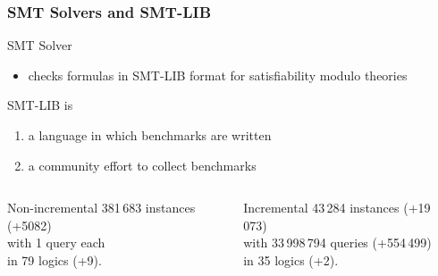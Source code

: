 \documentclass[table]{beamer}
\def\emph#1{\textcolor{MYblue}{#1}}
\begin{document}
\begin{frame}
  \frametitle{SMT Solvers and SMT-LIB}
  SMT Solver
  \begin{itemize}
  \item checks formulas 
    in \emph{SMT-LIB} format
    for \emph{satisfiability modulo theories}
  \end{itemize}
  \bigskip

  SMT-LIB is
  \begin{enumerate}
  \item a \emph{language} in which benchmarks are written
  \item a community effort to \emph{collect benchmarks}
  \end{enumerate}
  \medskip

  \begin{columns}
    \begin{column}{0.4\textwidth}
      \begin{block}{Non-incremental}
        381\,683 instances {\small (+5082)} \\
        with 1 query each \\
        in 79 logics {\small (+9)}.
      \end{block}
    \end{column}
    \begin{column}{0.4\textwidth}
      \begin{block}{Incremental}
        43\,284 instances {\small (+19\,073)}\\
        with 33\,998\,794 queries {\small (+554\,499)} \\
        in 35 logics {\small (+2)}.
      \end{block}
    \end{column}
    \begin{column}{0.08\textwidth}
    \end{column}
  \end{columns}
\end{frame}
\end{document}
